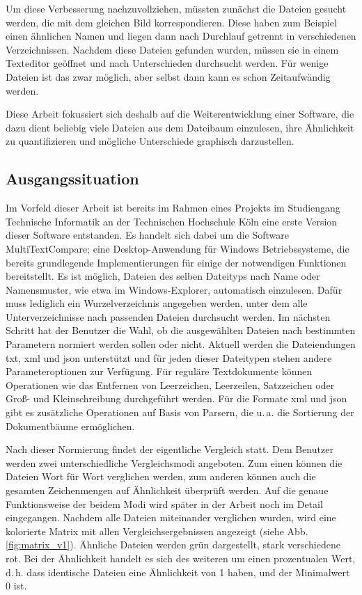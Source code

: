 Um diese Verbesserung nachzuvollziehen, müssten zunächst die Dateien gesucht werden, die mit dem gleichen Bild korrespondieren. Diese haben zum Beispiel einen ähnlichen Namen und liegen dann nach Durchlauf getrennt in verschiedenen Verzeichnissen. Nachdem diese Dateien gefunden wurden, müssen sie in einem Texteditor geöffnet und nach Unterschieden durchsucht werden. Für wenige Dateien ist das zwar möglich, aber selbst dann kann es schon Zeitaufwändig werden.

Diese Arbeit fokussiert sich deshalb auf die Weiterentwicklung einer Software, die dazu dient beliebig viele Dateien aus dem Dateibaum einzulesen, ihre Ähnlichkeit zu quantifizieren und mögliche Unterschiede graphisch darzustellen.

\subsection{Ausgangssituation}
Im Vorfeld dieser Arbeit ist bereits im Rahmen eines Projekts im Studiengang Technische Informatik an der Technischen Hochschule Köln eine erste Version dieser Software entstanden. Es handelt sich dabei um die Software MultiTextCompare; eine Desktop-Anwendung für Windows Betriebssysteme, die bereits grundlegende Implementierungen für einige der notwendigen Funktionen bereitstellt. Es ist möglich, Dateien des selben Dateityps nach Name oder Namensmuster, wie etwa im Windows-Explorer, automatisch einzulesen. Dafür muss lediglich ein Wurzelverzeichnis angegeben werden, unter dem alle Unterverzeichnisse nach passenden Dateien durchsucht werden. Im nächsten Schritt hat der Benutzer die Wahl, ob die ausgewählten Dateien nach bestimmten Parametern normiert werden sollen oder nicht. Aktuell werden die Dateiendungen txt, xml und json unterstützt und für jeden dieser Dateitypen stehen andere Parameteroptionen zur Verfügung. Für reguläre Textdokumente können Operationen wie das Entfernen von Leerzeichen, Leerzeilen, Satzzeichen oder Groß- und Kleinschreibung durchgeführt werden. Für die Formate \acrshort{xml} und \acrshort{json} gibt es zusätzliche Operationen auf Basis von Parsern, die u.\,a. die Sortierung der Dokumentbäume ermöglichen. 

Nach dieser Normierung findet der eigentliche Vergleich statt. Dem Benutzer werden zwei unterschiedliche Vergleichsmodi angeboten. Zum einen können die Dateien Wort für Wort verglichen werden, zum anderen können auch die gesamten Zeichenmengen auf Ähnlichkeit überprüft werden. Auf die genaue Funktionsweise der beidem Modi wird später in der Arbeit noch im Detail eingegangen. Nachdem alle Dateien miteinander verglichen wurden, wird eine kolorierte Matrix mit allen Vergleichsergebnissen angezeigt (siehe Abb. \ref{fig:matrix_v1}). Ähnliche Dateien werden grün dargestellt, stark verschiedene rot. Bei der Ähnlichkeit handelt es sich des weiteren um einen prozentualen Wert, d.\,h. dass identische Dateien eine Ähnlichkeit von 1 haben, und der Minimalwert 0 ist. 

